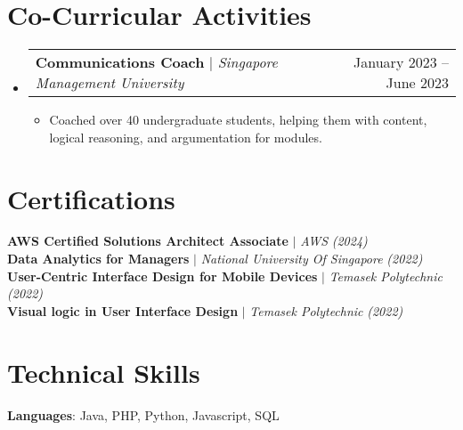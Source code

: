 \documentclass[letterpaper,11pt]{article}
\makeatletter
\newcommand{\resumeItem}[1]{
  \item\small{
    {#1 \vspace{-2pt}}
  }
}
\newcommand{\resumeProjectHeading}[2]{
    \item
    \begin{tabular*}{0.97\textwidth}{l@{\extracolsep{\fill}}r}
      \small#1 & #2 \\
    \end{tabular*}\vspace{-7pt}
}
\newcommand{\resumeSubHeadingListStart}{\begin{itemize}[leftmargin=0.15in, label={}]}
\newcommand{\resumeSubHeadingListEnd}{\end{itemize}}
\newcommand{\resumeItemListStart}{\begin{itemize}}
\newcommand{\resumeItemListEnd}{\end{itemize}\vspace{-5pt}}
\makeatother
\begin{document}
\section{Co-Curricular Activities}
  \resumeSubHeadingListStart
    \resumeProjectHeading
      {\textbf{Communications Coach} $|$ \emph{Singapore Management University}}{January 2023 -- June 2023}
    \resumeItemListStart
      \resumeItem{Coached over 40 undergraduate students, helping them with content, logical reasoning, and argumentation for modules.}
    \resumeItemListEnd
  \resumeSubHeadingListEnd

\section{Certifications}
 \begin{itemize}[leftmargin=0.15in, label={}]
    \small{\item{
     \textbf{AWS Certified Solutions Architect Associate}  $|$ \emph{AWS} \emph{(2024)} \\
     \textbf{Data Analytics for Managers} $|$ \emph{National University Of Singapore} \emph{(2022)} \\
     \textbf{User-Centric Interface Design for Mobile Devices}  $|$ \emph{Temasek Polytechnic} \emph{(2022)} \\
     \textbf{Visual logic in User Interface Design}  $|$ \emph{Temasek Polytechnic} \emph{(2022)} \\
    }}
 \end{itemize}

\section{Technical Skills}
 \begin{itemize}[leftmargin=0.15in, label={}]
    \small{\item{
     \textbf{Languages}{: Java, PHP, Python, Javascript, SQL} \\
    }}
 \end{itemize}
\end{document}
